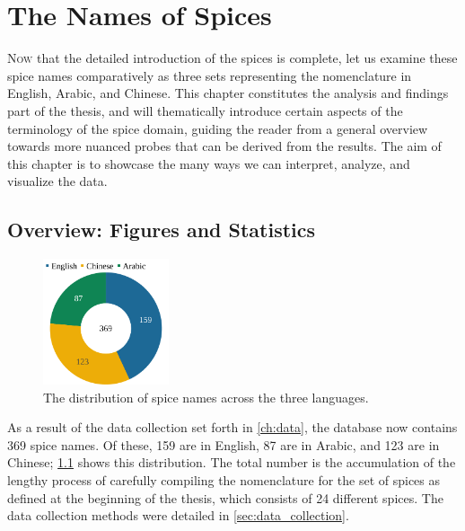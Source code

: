 \chapter{The Names of Spices}
\label{ch:names}



\lettrine[lines=\iniciale]{\textcolor{\accentcolor}{N}}{ow} that the detailed introduction of the spices is complete, let us examine these spice names comparatively as three sets representing the nomenclature in English, Arabic, and Chinese. This chapter constitutes the analysis and findings part of the thesis, and will thematically introduce certain aspects of the terminology of the spice domain, guiding the reader from a general overview towards more nuanced probes that can be derived from the results. The aim of this chapter is to showcase the many ways we can interpret, analyze, and visualize the data.


\section{Overview: Figures and Statistics}

\begin{figure}
  \vspace{-\baselineskip}
  \includegraphics[width=0.33\textwidth]{imgs/plots/languages_pie.pdf}
  \caption{The distribution of spice names across the three languages.}
  \label{fig:languages_pie}
\end{figure}

As a result of the data collection set forth in \cref{ch:data}, the database now contains 369 spice names. Of these, 159 are in English, 87 are in Arabic, and 123 are in Chinese; \cref{fig:languages_pie} shows this distribution.
The total number is the accumulation of the lengthy process of carefully compiling the nomenclature for the set of spices as defined at the beginning of the thesis, which consists of 24 different spices. The data collection methods were detailed in \cref{sec:data_collection}. 

